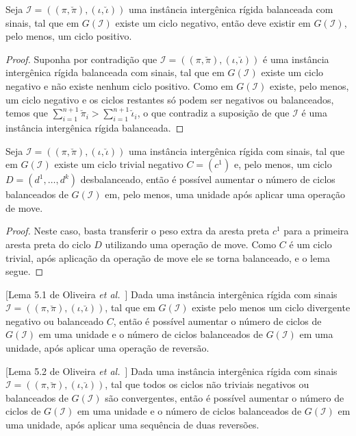 \begin{lemma}\label{lemma:UXFNYAGI}
Seja $\mathcal{I} = ((\pi,\breve\pi),(\iota,\breve\iota))$ uma instância intergênica rígida balanceada com sinais, tal que em $G(\mathcal{I})$ existe um ciclo negativo, então deve existir em $G(\mathcal{I})$, pelo menos, um ciclo positivo.
\end{lemma}
\begin{proof}
Suponha por contradição que $\mathcal{I}=((\pi,\breve\pi),(\iota,\breve\iota))$ é uma instância intergênica rígida balanceada com sinais, tal que em $G(\mathcal{I})$ existe um ciclo negativo e não existe nenhum ciclo positivo. Como em $G(\mathcal{I})$ existe, pelo menos, um ciclo negativo e os ciclos restantes só podem ser negativos ou balanceados, temos que $\sum_{i=1}^{n+1}\breve\pi_i > \sum_{i=1}^{n+1}\breve\iota_i$, o que contradiz a suposição de que $\mathcal{I}$ é uma instância intergênica rígida balanceada.
\end{proof}

\begin{lemma}\label{lemma:NTNBEHIO}
Seja $\mathcal{I} = ((\pi,\breve\pi),(\iota,\breve\iota))$ uma instância intergênica rígida com sinais, tal que em $G(\mathcal{I})$ existe um ciclo trivial negativo $C=(c^1)$ e, pelo menos, um ciclo $D=(d^1,\dots,d^k)$ desbalanceado, então é possível aumentar o número de ciclos balanceados de $G(\mathcal{I})$ em, pelo menos, uma unidade após aplicar uma operação de move.
\end{lemma}
\begin{proof}
Neste caso, basta transferir o peso extra da aresta preta $c^1$ para a primeira aresta preta do ciclo $D$ utilizando uma operação de move. Como $C$ é um ciclo trivial, após aplicação da operação de move ele se torna balanceado, e o lema segue.
\end{proof}

\begin{lemma}\label{lemma:IWIAXMBS}[Lema 5.1 de Oliveira \textit{et al.}~\cite{2021b-oliveira-etal}]
Dada uma instância intergênica rígida com sinais $\mathcal{I}=((\pi,\breve\pi),(\iota,\breve\iota))$, tal que em $G(\mathcal{I})$ existe pelo menos um ciclo divergente negativo ou balanceado $C$, então é possível aumentar o número de ciclos de $G(\mathcal{I})$ em uma unidade e o número de ciclos balanceados de $G(\mathcal{I})$ em uma unidade, após aplicar uma operação de reversão.
\end{lemma}

\begin{lemma}\label{lemma:ZLLUMKJN}[Lema 5.2 de Oliveira \textit{et al.}~\cite{2021b-oliveira-etal}]
Dada uma instância intergênica rígida com sinais $\mathcal{I}=((\pi,\breve\pi),(\iota,\breve\iota))$, tal que todos os ciclos não triviais negativos ou balanceados de $G(\mathcal{I})$ são convergentes, então é possível aumentar o número de ciclos de $G(\mathcal{I})$ em uma unidade e o número de ciclos balanceados de $G(\mathcal{I})$ em uma unidade, após aplicar uma sequência de duas reversões.
\end{lemma}

